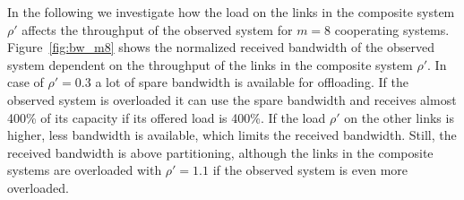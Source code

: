 In the following we investigate how the load on the links in the composite system $\rho'$ affects the throughput of the observed system for $m=8$ cooperating systems.
Figure~\ref{fig:bw_m8} shows the normalized received bandwidth of the observed system dependent on the throughput of the links in the composite system $\rho'$.
In case of $\rho'=0.3$ a lot of spare bandwidth is available for offloading. If the observed system is overloaded it can use the spare bandwidth and receives almost 400\% of its capacity if its offered load is 400\%. If the load $\rho'$ on the other links is higher, less bandwidth is available, which limits the received bandwidth. Still, the received bandwidth is above partitioning, although the links in the composite systems are overloaded with $\rho'=1.1$ if the observed system is even more overloaded.


